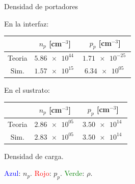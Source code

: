\documentclass{/home/daniel/GitHub/USC-Physics-Degree-Notes/Notes/Presentacion}
\begin{document}
\begin{frame}{Densidad de portadores}
    \begin{minipage}{0.4\linewidth}
        \begin{center}
            \small
            En la interfaz: 
            \vspace*{1em}

            \begin{tabular}{ccc}
                \toprule
                & $n_p $ [cm$^{-3}$] & $p_p $ [cm$^{-3}$]  \\ \midrule
                Teoria &$\SI{5.86e+44}{}$& $\SI{1.71e-25}{}$\\

                Sim. & $\SI{1.57e+15}{}$ & $\SI{6.34e+05}{}$  \\
                \bottomrule
            \end{tabular}

            \vspace*{2em}

            En el sustrato: 

            \vspace*{1em}


            \begin{tabular}{ccc}
                \toprule
                & $n_p $ [cm$^{-3}$] & $p_p $ [cm$^{-3}$]  \\ \midrule
                Teoria & $\SI{2.86e+05}{}$ & $\SI{3.50e+14}{}$ \\
                Sim. & $\SI{2.83e+05}{}$ & $\SI{3.50e+14}{}$ \\
                \bottomrule
            \end{tabular}

        \end{center}
    \end{minipage}
    \hfill
    \begin{minipage}{0.55\linewidth}\centering

        Densidad de carga.

        \vspace*{0.5em}

        \textcolor{blue}{Azul}: $n_p$. \textcolor{red}{Rojo}: $p_p$. \textcolor{Green}{Verde}: $\rho$.  

        \vspace*{1em}


\end{minipage}
\end{frame}
\end{document}
